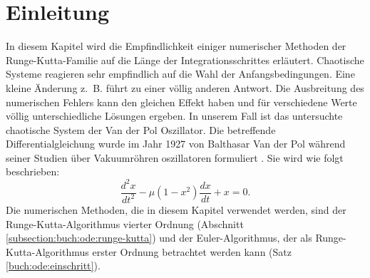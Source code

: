 %
%
%
\section{Einleitung\label{vanderpol:section:einleitung}}
In diesem Kapitel wird die Empfindlichkeit einiger numerischer Methoden der Runge-Kutta-Familie auf die Länge der Integrationsschrittes erläutert.
Chaotische Systeme reagieren sehr empfindlich auf die Wahl der Anfangsbedingungen. Eine kleine Änderung z.~B. führt zu einer völlig anderen Antwort.
Die Ausbreitung des numerischen Fehlers kann den gleichen Effekt haben und für verschiedene Werte völlig unterschiedliche Lösungen ergeben.
In unserem Fall ist das untersuchte chaotische System der Van der Pol Oszillator.
Die betreffende Differentialgleichung wurde im Jahr 1927 von Balthasar Van der Pol während seiner Studien über Vakuumröhren oszillatoren formuliert \cite{vanderpol:bibvdp}.
Sie wird wie folgt beschrieben:
\begin{equation}
\frac{d^{2}x}{dt^{2}} - \mu (1 - x^{2}) \frac{dx}{dt} + x = 0.
\label{vanderpol:equations:vdp}
\end{equation}
Die numerischen Methoden, die in diesem Kapitel verwendet werden, sind der Runge-Kutta-Algorithmus vierter Ordnung (Abschnitt \ref{subsection:buch:ode:runge-kutta}) und der Euler-Algorithmus, der als Runge-Kutta-Algorithmus erster Ordnung betrachtet werden kann (Satz \ref{buch:ode:einschritt}).
